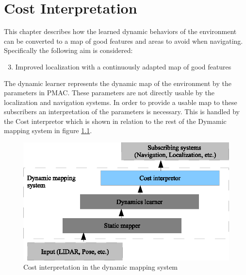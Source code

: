 \chapter{Cost Interpretation}
This chapter describes how the learned dynamic behaviors of the environment can be converted to a map of good features and areas to avoid when navigating. Specifically the following aim is considered:

\begin{enumerate}
    \setcounter{enumi}{2}
    \item Improved localization with a continuously adapted map of good features
\end{enumerate}

The dynamic learner represents the dynamic map of the environment by the parameters in PMAC. These parameters are not directly usable by the localization and navigation systems. In order to provide a usable map to these subscribers an interpretation of the parameters is necessary. This is handled by the Cost interpretor which is shown in relation to the rest of the Dymamic mapping system in figure \ref{fig:cost_overview}.

\begin{figure}[htbp]
	\centering
	\includegraphics[scale=1]{chapters/cost_interpretation/figures/cost_overview.eps}
	\caption{Cost interpretation in the dynamic mapping system}
	\label{fig:cost_overview}
\end{figure}








